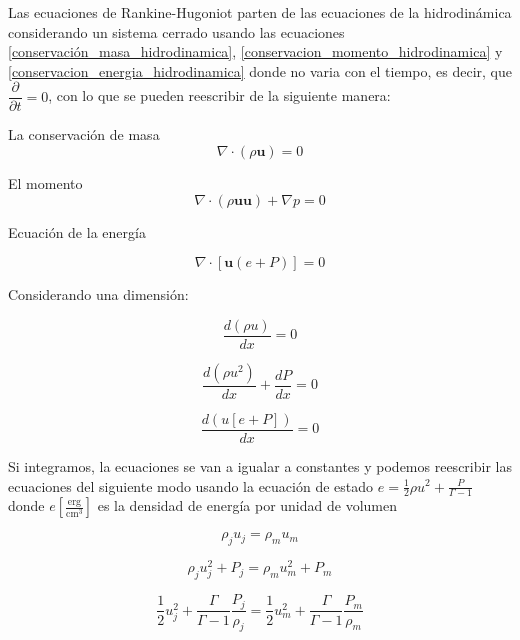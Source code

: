 \documentclass[12pt,a4paper]{book}
\begin{document}
Las ecuaciones de Rankine-Hugoniot parten de las ecuaciones de la hidrodinámica considerando un sistema cerrado usando las ecuaciones \ref{conservación_masa_hidrodinamica}, \ref{conservacion_momento_hidrodinamica} y \ref{conservacion_energia_hidrodinamica} donde no varia con el tiempo, es decir, que $\dfrac{\partial}{\partial t}=0$, con lo que se pueden reescribir de la siguiente manera:


La conservación de masa
\begin{equation}
  \nabla \cdot \left( \rho \mathbf{u} \right)=0
\end{equation}

El momento
\begin{equation}
  \nabla \cdot \left( \rho \mathbf{u u} \right) + \nabla p = 0
\end{equation}

Ecuación de la energía

\begin{equation}
 \nabla \cdot \left[ \mathbf{u} \left( e+P \right) \right] = 0
\end{equation}

Considerando una dimensión:

\begin{equation}
\dfrac{d \left( \rho u \right)}{d x} = 0
\end{equation}

\begin{equation}
\dfrac{d \left( \rho u^2 \right)}{d x}+ \dfrac{d P}{d x}=0
\end{equation}

\begin{equation}
\dfrac{d \left( u\left[e +P \right] \right)}{d x} = 0
\end{equation}

Si integramos, la ecuaciones se van a igualar a constantes y podemos reescribir las ecuaciones del siguiente modo usando 
la ecuación de estado $e = \frac{1}{2} \rho u^2 + \frac{P}{\Gamma-1}$ donde $e \left[\frac{\mathrm{erg}}{\mathrm{cm^3}}\right]$ 
es la densidad de energía por unidad de volumen

\begin{equation}\label{RH_masa}
\rho_j u_j = \rho_m u_m
\end{equation}

\begin{equation}\label{RH_momento}
\rho_j u_{j}^{2}+P_j = \rho_m u_{m}^{2}+P_m
\end{equation}

\begin{equation}\label{RH_Energia}
\frac{1}{2} u_{j}^{2}+ \frac{\Gamma}{\Gamma-1} \frac{P_{j}}{\rho_{j}} =
 \frac{1}{2} u_{m}^{2}+ \frac{\Gamma}{\Gamma-1} \frac{P_{m}}{\rho_{m}}
\end{equation}
\end{document}
